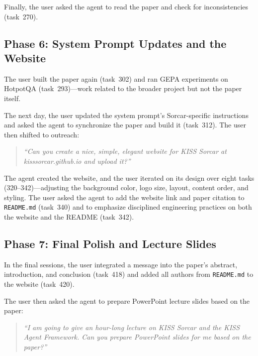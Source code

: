 \documentclass{article}
\begin{document}
Finally, the user asked the agent to read the paper and check for inconsistencies (task~270).

\subsection{Phase 6: System Prompt Updates and the Website}
\label{sec:phase6}

The user built the paper again (task~302) and ran GEPA experiments on HotpotQA (task~293)---work related to the broader project but not the paper itself.

The next day, the user updated the system prompt's Sorcar-specific instructions and asked the agent to synchronize the paper and build it (task~312).  The user then shifted to outreach:

\begin{quote}
\textit{``Can you create a nice, simple, elegant website for KISS Sorcar at kisssorcar.github.io and upload it?''}
\end{quote}

The agent created the website, and the user iterated on its design over eight tasks (320--342)---adjusting the background color, logo size, layout, content order, and styling.  The user asked the agent to add the website link and paper citation to \texttt{README.md} (task~340) and to emphasize disciplined engineering practices on both the website and the README (task~342).

\subsection{Phase 7: Final Polish and Lecture Slides}
\label{sec:phase7}

In the final sessions, the user integrated a message into the paper's abstract, introduction, and conclusion (task~418) and added all authors from \texttt{README.md} to the website (task~420).

The user then asked the agent to prepare PowerPoint lecture slides based on the paper:

\begin{quote}
\textit{``I am going to give an hour-long lecture on KISS Sorcar and the KISS Agent Framework.  Can you prepare PowerPoint slides for me based on the paper?''}
\end{quote}
\end{document}
